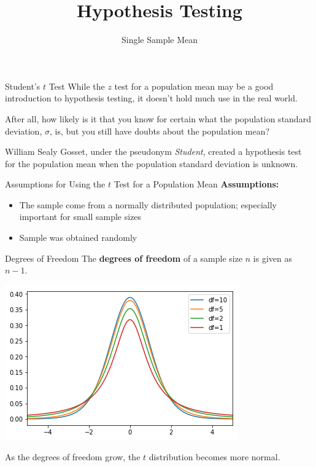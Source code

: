\documentclass[t]{beamer}
\title{Hypothesis Testing}
\subtitle{Single Sample Mean}
\author{}
\date{}
\begin{document}

\begin{frame} 
\maketitle
\end{frame}

\begin{frame}{Student's $t$ Test}
While the $z$ test for a population mean may be a good introduction to hypothesis testing, it doesn't hold much use in the real world. \newline\\	\pause

After all, how likely is it that you know for certain what the population standard deviation, $\sigma$, is, but you still have doubts about the population mean?	\newline\\	\pause

William Sealy Gosset, under the pseudonym \textit{Student}, created a hypothesis test for the population mean when the population standard deviation is unknown.
\end{frame}

\begin{frame}{Assumptions for Using the $t$ Test for a Population Mean}
\textbf{Assumptions:} 
\begin{itemize}
	\item<2-> The sample come from a normally distributed population; especially important for small sample sizes
	\item<3-> Sample was obtained randomly
\end{itemize}
\end{frame}

\begin{frame}{Degrees of Freedom}
The \textbf{degrees of freedom} of a sample size $n$ is given as $n - 1$.	\pause

\begin{center}
\includegraphics[scale=0.6]{../Images/t_distribution_df.png}
\end{center}
\pause

As the degrees of freedom grow, the $t$ distribution becomes more normal.
\end{frame}
\end{document}
